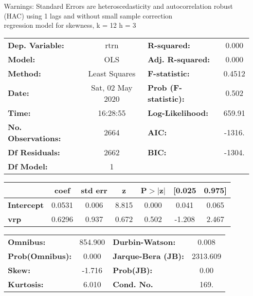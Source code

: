 Warnings: \newline
 [1] Standard Errors are heteroscedasticity and autocorrelation robust (HAC) using 1 lags and without small sample correction\\ 

regression model for skewness, k = 12 h = 3\begin{center}
\begin{tabular}{lclc}
\toprule
\textbf{Dep. Variable:}    &       rtrn       & \textbf{  R-squared:         } &     0.000   \\
\textbf{Model:}            &       OLS        & \textbf{  Adj. R-squared:    } &     0.000   \\
\textbf{Method:}           &  Least Squares   & \textbf{  F-statistic:       } &    0.4512   \\
\textbf{Date:}             & Sat, 02 May 2020 & \textbf{  Prob (F-statistic):} &    0.502    \\
\textbf{Time:}             &     16:28:55     & \textbf{  Log-Likelihood:    } &    659.91   \\
\textbf{No. Observations:} &        2664      & \textbf{  AIC:               } &    -1316.   \\
\textbf{Df Residuals:}     &        2662      & \textbf{  BIC:               } &    -1304.   \\
\textbf{Df Model:}         &           1      & \textbf{                     } &             \\
\bottomrule
\end{tabular}
\begin{tabular}{lcccccc}
                   & \textbf{coef} & \textbf{std err} & \textbf{z} & \textbf{P$> |$z$|$} & \textbf{[0.025} & \textbf{0.975]}  \\
\midrule
\textbf{Intercept} &       0.0531  &        0.006     &     8.815  &         0.000        &        0.041    &        0.065     \\
\textbf{vrp}       &       0.6296  &        0.937     &     0.672  &         0.502        &       -1.208    &        2.467     \\
\bottomrule
\end{tabular}
\begin{tabular}{lclc}
\textbf{Omnibus:}       & 854.900 & \textbf{  Durbin-Watson:     } &    0.008  \\
\textbf{Prob(Omnibus):} &   0.000 & \textbf{  Jarque-Bera (JB):  } & 2313.609  \\
\textbf{Skew:}          &  -1.716 & \textbf{  Prob(JB):          } &     0.00  \\
\textbf{Kurtosis:}      &   6.010 & \textbf{  Cond. No.          } &     169.  \\
\bottomrule
\end{tabular}
\end{center}

